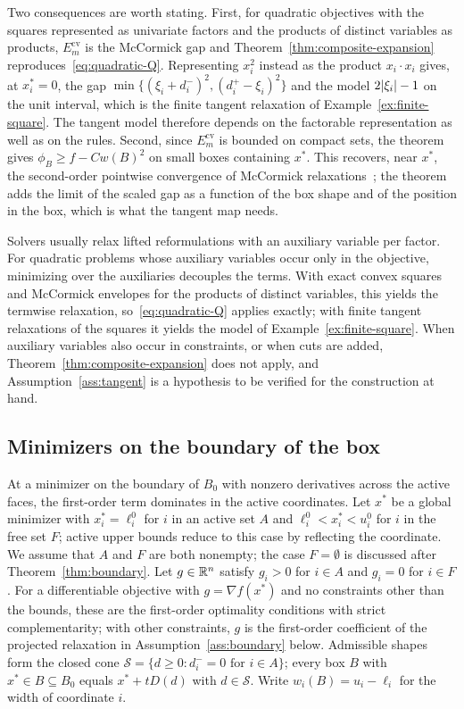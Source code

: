 Two consequences are worth stating. First, for quadratic objectives with
the squares represented as univariate factors and the products of distinct
variables as products, $E_m^{\mathrm{cv}}$ is the McCormick gap and
Theorem~\ref{thm:composite-expansion} reproduces~\eqref{eq:quadratic-Q}.
Representing $x_i^2$ instead as the product $x_i\cdot x_i$ gives, at
$x_i^*=0$, the gap $\min\{(\xi_i+d_i^-)^2,(d_i^+-\xi_i)^2\}$ and the model
$2\lvert \xi_i\rvert-1$ on the unit interval, which is the finite tangent
relaxation of Example~\ref{ex:finite-square}. The tangent model therefore
depends on the factorable representation as well as on the rules. Second,
since $E_m^{\mathrm{cv}}$ is bounded on compact sets, the theorem gives
$\phi_B\ge f-Cw(B)^2$ on small boxes containing $x^*$. This recovers, near
$x^*$, the second-order pointwise convergence of McCormick
relaxations~\cite{bompadre2012-convergence-rate-of-mccormick-relaxations}; the theorem
adds the limit of the scaled gap as a function of the box shape and of the
position in the box, which is what the tangent map needs.

Solvers usually relax lifted reformulations with an auxiliary variable per
factor. For quadratic problems whose auxiliary variables occur only in the
objective, minimizing over the auxiliaries decouples the terms. With exact
convex squares and McCormick envelopes for the products of distinct
variables, this yields the termwise relaxation, so~\eqref{eq:quadratic-Q}
applies exactly; with finite tangent relaxations of the squares it yields
the model of Example~\ref{ex:finite-square}. When
auxiliary variables also occur in constraints, or when cuts are added,
Theorem~\ref{thm:composite-expansion} does not apply, and
Assumption~\ref{ass:tangent} is a hypothesis to be verified for the
construction at hand.

\subsection{Minimizers on the boundary of the box}\label{sec:local-rates-boundary}

At a minimizer on the boundary of $B_0$ with nonzero derivatives across the
active faces, the first-order term dominates in the active coordinates.
Let $x^*$ be a global minimizer with $x_i^*=\ell_i^0$ for $i$ in an active
set $A$ and $\ell_i^0<x_i^*<u_i^0$ for $i$ in the free set $F$; active upper
bounds reduce to this case by reflecting the coordinate. We assume that $A$ and $F$ are both nonempty; the case $F=\emptyset$ is
discussed after Theorem~\ref{thm:boundary}. Let $g\in\mathbb{R}^n$ satisfy $g_i>0$
for $i\in A$ and $g_i=0$ for $i\in F$. For a differentiable objective with
$g=\nabla f(x^*)$ and no constraints other than the bounds, these are the
first-order optimality conditions with strict complementarity; with other
constraints, $g$ is the first-order coefficient of the projected
relaxation in Assumption~\ref{ass:boundary} below. Admissible shapes form the closed cone
$\mathcal S=\{d\ge0:d_i^-=0\text{ for }i\in A\}$; every box $B$ with
$x^*\in B\subseteq B_0$ equals $x^*+tD(d)$ with $d\in\mathcal S$. Write
$w_i(B)=u_i-\ell_i$ for the width of coordinate $i$.


